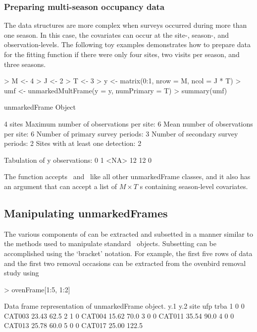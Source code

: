 \documentclass[article,shortnames]{jss}
\newcommand{\rlang}{\proglang{R}}
\newcommand{\scovs}{\code{siteCovs}}
\newcommand{\ocovs}{\code{obsCovs}}
\begin{document}
\subsubsection{Preparing multi-season occupancy data}

The data structures are more complex when surveys occurred during more than one
season. In this case, the covariates can occur at the site-, season-, and
observation-levels. The following toy examples demonstrates how to prepare data
for the  fitting function if there were only four sites, two
visits per season, and three seasons.

\begin{Schunk}
\begin{Sinput}
> M <- 4
> J <- 2
> T <- 3
> y <- matrix(0:1, nrow = M, ncol = J * T)
> umf <- unmarkedMultFrame(y = y, numPrimary = T)
> summary(umf)
\end{Sinput}
\begin{Soutput}
unmarkedFrame Object

4 sites
Maximum number of observations per site: 6 
Mean number of observations per site: 6 
Number of primary survey periods: 3 
Number of secondary survey periods: 2 
Sites with at least one detection: 2 

Tabulation of y observations:
   0    1 <NA> 
  12   12    0 
\end{Soutput}
\end{Schunk}

The function  accepts \scovs\ and \ocovs\ like all 
other unmarkedFrame classes, and it also has an argument 
that can accept a list of $M \times T$ s containing season-level
covariates.

\subsection{Manipulating unmarkedFrames}
\label{sec:manip}

The various components of  can be extracted and subsetted in
a manner similar to the methods used to manipulate standard \rlang\ objects.  
Subsetting can be accomplished using the `bracket' notation. For example, 
the first five rows of data and the first two removal occasions can be 
extracted from the ovenbird removal study using

\begin{Schunk}
\begin{Sinput}
> ovenFrame[1:5, 1:2]
\end{Sinput}
\begin{Soutput}
Data frame representation of unmarkedFrame object.
  y.1 y.2   site   ufp  trba
1   0   0 CAT003 23.43  62.5
2   1   0 CAT004 15.62  70.0
3   0   0 CAT011 35.54  90.0
4   0   0 CAT013 25.78  60.0
5   0   0 CAT017 25.00 122.5
\end{Soutput}
\end{Schunk}
\end{document}
